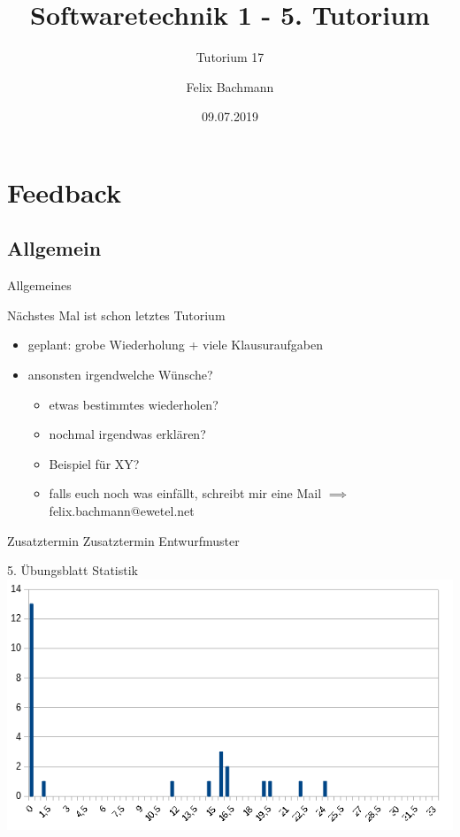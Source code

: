 \documentclass[18pt]{beamer}
\title[SWT1]{Softwaretechnik 1 - 5. Tutorium}
\subtitle{Tutorium 17}
\author{Felix Bachmann}
\date{09.07.2019}
\institute{KIT - Institut für Programmstrukturen und Datenorganisation (IPD)}
\begin{document}
	
\begin{frame}
\titlepage
\end{frame}

\begin{frame}
\tableofcontents
\end{frame}


\section{Feedback}

	\subsection{Allgemein}
	\begin{frame}{Allgemeines}
		\begin{alertblock}{Nächstes Mal ist schon letztes Tutorium} 
		\begin{itemize}
			\item geplant: grobe Wiederholung + viele Klausuraufgaben \pause
			\item ansonsten irgendwelche Wünsche?
			\begin{itemize}
				\item etwas bestimmtes wiederholen?
				\item nochmal irgendwas erklären?
				\item Beispiel für XY?
				\item falls euch noch was einfällt, schreibt mir eine Mail
				\linebreak $\implies$ felix.bachmann@ewetel.net
			\end{itemize}
		\end{itemize}
		\end{alertblock}
	\end{frame}

	\begin{frame}{Zusatztermin}
		\centering \huge Zusatztermin Entwurfmuster
	\end{frame}

	\begin{frame}{5. Übungsblatt Statistik}
		\includegraphics[scale=0.7]{./pics/tut5/statistics-ub5.png}
	\end{frame}
\end{document}
